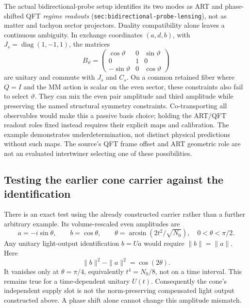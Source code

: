 \documentclass[11pt,a4paper]{article}
\begin{document}
The actual bidirectional-probe setup identifies its two modes as
ART and phase-shifted QFT \emph{regime readouts}
(\texttt{sec:bidirectional-probe-lensing}), not as matter and tachyon
sector projectors. Duality compatibility alone leaves a continuous
ambiguity. In exchange coordinates $(a,d,b)$, with
$J_s=\operatorname{diag}(1,-1,1)$, the matrices
\[
 B_\vartheta=
 \begin{pmatrix}
 \cos\vartheta&0&\sin\vartheta\\
 0&1&0\\-\sin\vartheta&0&\cos\vartheta
 \end{pmatrix}
\]
are unitary and commute with $J_s$ and $C_s$. On a common retained
fiber where $Q=I$ and the MM action is scalar on the even sector,
these constraints also fail to select $\vartheta$. They can mix the
even pair amplitude and third amplitude while preserving the named
structural symmetry constraints. Co-transporting all observables
would make this a passive basis choice; holding the ART/QFT readout
roles fixed instead requires their explicit maps and calibration.
The example demonstrates underdetermination, not distinct physical
predictions without such maps. The source's QFT frame offset and
ART geometric role are not an evaluated intertwiner selecting one
of these possibilities.

\subsection{Testing the earlier cone carrier against the identification}

There is an exact test using the already constructed carrier rather
than a further arbitrary example. Its volume-rescaled even amplitudes
are
\[
 a=-i\sin\theta,\qquad b=\cos\theta,\qquad
 \theta=\arcsin(2t^2/\sqrt{N_0}),\quad 0<\theta<\pi/2.
\]
Any unitary light-output identification $b=Ua$ would require
$\|b\|=\|a\|$. Here
\[
 \|b\|^2-\|a\|^2=\cos(2\theta).
\]
It vanishes only at $\theta=\pi/4$, equivalently $t^4=N_0/8$,
not on a time interval. This remains true for a time-dependent
unitary $U(t)$. Consequently the cone's independent supply slot
is not the norm-preserving compensated light output constructed
above. A phase shift alone cannot change this amplitude mismatch.
\end{document}
